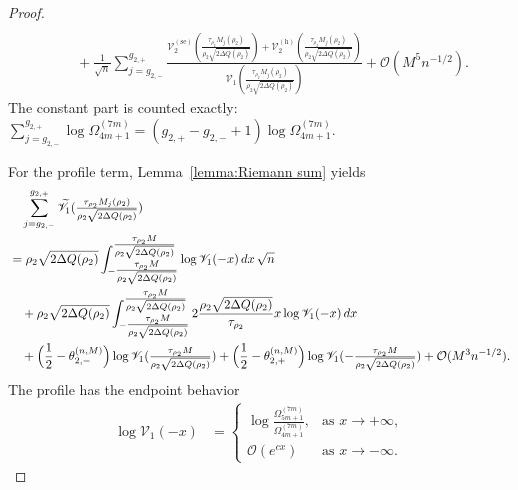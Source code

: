 \documentclass[a4paper]{article}
\numberwithin{equation}{section}
\begin{document}
\begin{proof}
\begin{align*}
\\
&\quad
+\frac{1}{\sqrt{n}}\sum_{j=g_{2,-}}^{g_{2,+}}
\frac{\mathscr{V}_2^{(\mathrm{se})}(\tfrac{\tau_{\rho_2}M_{j}(\rho_2)}{\rho_2\sqrt{2\Delta Q(\rho_2)}})+\mathscr{V}_2^{(\mathrm{h})}(\tfrac{\tau_{\rho_2}M_{j}(\rho_2)}{\rho_2\sqrt{2\Delta Q(\rho_2)}})}{\mathscr{V}_1(\tfrac{\tau_{\rho_2}M_{j}(\rho_2)}{\rho_2\sqrt{2\Delta Q(\rho_2)}})}
+\mathcal{O}(M^5n^{-1/2}).
\end{align*}
The constant part is counted exactly:
$\sum_{j=g_{2,-}}^{g_{2,+}}\log\Omega_{4m+1}^{(7m)}
=(g_{2,+}-g_{2,-}+1)\log\Omega_{4m+1}^{(7m)}$.

For the profile term, Lemma~\ref{lemma:Riemann sum} yields
\begin{align*}
&\quad\sum_{j=g_{2,-}}^{g_{2,+}}\widetilde{\mathscr{V}}_1(\tfrac{\tau_{\rho_2}M_j(\rho_2)}{\rho_2\sqrt{2\Delta Q(\rho_2)}})
\\
&=
\rho_2\sqrt{2\Delta Q(\rho_2)}
\int_{-\tfrac{\tau_{\rho_2}M}{\rho_2\sqrt{2\Delta Q(\rho_2)}}}^{\tfrac{\tau_{\rho_2}M}{\rho_2\sqrt{2\Delta Q(\rho_2)}}}
\log \mathscr{V}_1(-x)\,dx\,
\sqrt{n}
\\
&\quad
+\rho_2\sqrt{2\Delta Q(\rho_2)}\int_{-\tfrac{\tau_{\rho_2}M}{\rho_2\sqrt{2\Delta Q(\rho_2)}}}^{\tfrac{\tau_{\rho_2}M}{\rho_2\sqrt{2\Delta Q(\rho_2)}}}
2 \frac{\rho_2\sqrt{2\Delta Q(\rho_2)}}{\tau_{\rho_2}}x
\log \mathscr{V}_1(-x)\,dx
\\
&\quad
+\Bigl(\frac{1}{2}-\theta_{2,-}^{(n,M)}\Bigr)\log \mathscr{V}_1(\tfrac{\tau_{\rho_2}M}{\rho_2\sqrt{2\Delta Q(\rho_2)}})
+\Bigl(\frac{1}{2}-\theta_{2,+}^{(n,M)}\Bigr)\log \mathscr{V}_1(-\tfrac{\tau_{\rho_2}M}{\rho_2\sqrt{2\Delta Q(\rho_2)}})
+\mathcal{O}(M^3n^{-1/2}). 
\end{align*}
The profile has the endpoint behavior
\begin{align*}
\log \mathscr{V}_1(-x)
&=
\begin{cases}
\log\frac{\Omega_{5m+1}^{(7m)}}{\Omega_{4m+1}^{(7m)}},     & \mbox{as } x\to+\infty, \\
\mathcal{O}(e^{cx})   & \mbox{as } x\to-\infty. 
\end{cases}

\end{align*}
\end{proof}
\end{document}
